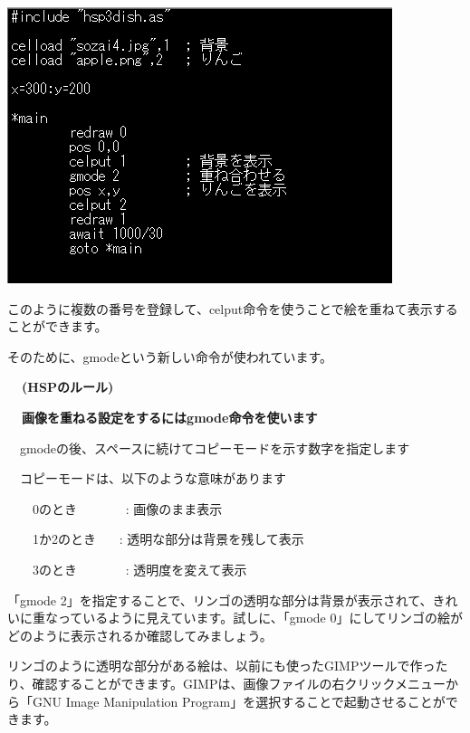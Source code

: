 \documentclass[a4paper,12pt]{jarticle}
\begin{document}
\bigskip
\bigskip
\bigskip

\bigskip
\bigskip

\begin{minipage}{9.781cm}
\centering
{\upshape
\includegraphics[keepaspectratio,width=11.245cm,height=8.07cm]{text04-img/text04-img017.png}}
\end{minipage}

\bigskip
\bigskip
\bigskip

このように複数の番号を登録して、celput命令を使うことで絵を重ねて表示することができます。

そのために、gmodeという新しい命令が使われています。


\bigskip

{\bfseries
\ \ (HSPのルール)}

\bigskip

{\bfseries
\ \ 画像を重ねる設定をするにはgmode命令を使います

\ \ gmodeの後、スペースに続けてコピーモードを示す数字を指定します

\ \ コピーモードは、以下のような意味があります

\ \ \ \ 0のとき \ \ \ \ \ \ \ : 画像のまま表示

\ \ \ \ 1か2のとき \ \ \ : 透明な部分は背景を残して表示

\ \ \ \ 3のとき \ \ \ \ \ \ \ : 透明度を変えて表示}

\bigskip

「gmode 2」を指定することで、リンゴの透明な部分は背景が表示されて、きれいに重なっているように見えています。試しに、「gmode 0」にしてリンゴの絵がどのように表示されるか確認してみましょう。

リンゴのように透明な部分がある絵は、以前にも使ったGIMPツールで作ったり、確認することができます。GIMPは、画像ファイルの右クリックメニューから「GNU Image Manipulation Program」を選択することで起動させることができます。
\end{document}
